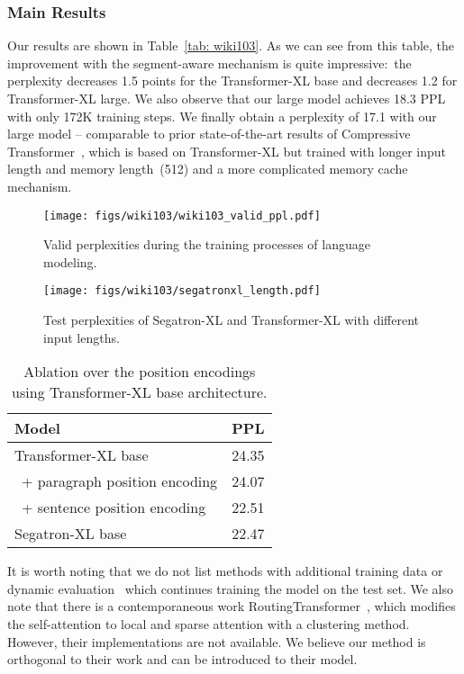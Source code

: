 \documentclass[letterpaper]{article}
\begin{document}
\subsubsection{Main Results}
Our results are shown in Table~\ref{tab: wiki103}. 
As we can see from this table, the improvement with the segment-aware mechanism is quite impressive:\ the perplexity decreases 1.5 points for the Transformer-XL base and decreases 1.2 for Transformer-XL large. 
We also observe that our large model achieves 18.3 PPL with only 172K training steps.
We finally obtain a perplexity of 17.1 with our large model -- comparable to prior state-of-the-art results of Compressive Transformer~\cite{DBLP:conf/iclr/RaePJHL20}, which is based on Transformer-XL but trained with longer input length and memory length~(512) and a more complicated memory cache mechanism. 


\begin{figure}[t]
  \centering
  \texttt{[image: figs/wiki103/wiki103\_valid\_ppl.pdf]}
\caption{Valid perplexities during the training processes of language modeling.}
  \label{fig: ppl_wiki103}
\end{figure} 
\begin{figure}[ht!]
  \centering
  \texttt{[image: figs/wiki103/segatronxl\_length.pdf]}
\caption{Test perplexities of Segatron-XL and Transformer-XL with different input lengths.}
  \label{fig: segatronxl_length}
\end{figure} \begin{table}[t]\centering
  \begin{tabular}{lc}\toprule
  Model &PPL \\\midrule
  Transformer-XL base &24.35 \\
  ~+ paragraph position encoding &24.07 \\
  ~+ sentence position encoding &22.51 \\
  Segatron-XL base &22.47 \\
  \bottomrule
  \end{tabular}
  \caption{Ablation over the position encodings using Transformer-XL base architecture.}\label{tab:ablation_ppl}
  \end{table}
 
It is worth noting that we do not list methods with additional training data or dynamic evaluation~\cite{DBLP:conf/icml/KrauseK0R18} which continues training the model on the test set. 
We also note that there is a contemporaneous work RoutingTransformer~\cite{DBLP:journals/corr/abs-2003-05997}, which modifies the self-attention to local and sparse attention with a clustering method. 
However, their implementations are not available.
We believe our method is orthogonal to their work and can be introduced to their model.
\end{document}
